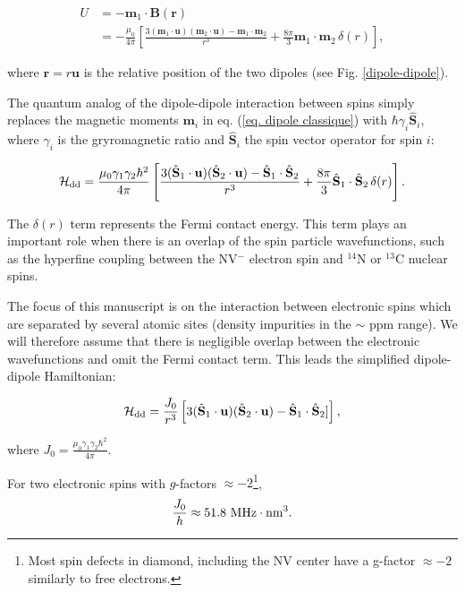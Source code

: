 \documentclass[a4paper, 11pt]{book}
\begin{document}
\begin{align}
U&=-\mathbf{m}_1 \cdot \mathbf{B}(\mathbf{r}) \nonumber \\
&=-\frac{\mu_0}{4 \pi}\left[ \frac{3 (\mathbf{m}_1\cdot\mathbf{u})(\mathbf{m}_2\cdot\mathbf{u}) - \mathbf{m}_1\cdot\mathbf{m}_2}{r^3}+\frac{8\pi}{3}\mathbf{m}_1\cdot\mathbf{m}_2\,\delta(r)\right], \label{eq. dipole classique}
\end{align}

where $\mathbf{r}=r \mathbf{u}$ is the relative position of the two dipoles (see Fig. \ref{dipole-dipole}). 

The quantum analog of the dipole-dipole interaction between spins simply replaces the magnetic moments $\mathbf{m}_i$ in eq. (\ref{eq. dipole classique}) with $\hbar \gamma_i \hat{\mathbf{S}}_i$, where $\gamma_i$ is the gryromagnetic ratio and $\hat{\mathbf{S}}_i$ the spin vector operator for spin $i$:

\begin{equation}
\mathcal{H}_{\rm dd}=\frac{\mu_0 \gamma_1 \gamma_2 \hbar^2}{4 \pi}\left[ \frac{3 (\hat{\mathbf{S}}_1\cdot\mathbf{u})(\hat{\mathbf{S}}_2\cdot\mathbf{u}) - \hat{\mathbf{S}}_1\cdot\hat{\mathbf{S}}_2}{r^3}+\frac{8\pi}{3}\hat{\mathbf{S}}_1\cdot\hat{\mathbf{S}}_2\,\delta(r)\right].
\end{equation}

The $\delta(r)$ term represents the Fermi contact energy. This term plays an important role when there is an overlap of the spin particle wavefunctions, such as the hyperfine coupling between the NV$^-$ electron spin and $^{14}$N \cite{doherty2012theory} or  $^{13}$C \cite{smeltzer201113c} nuclear spins.

The focus of this manuscript is on the interaction between electronic spins which are separated by several atomic sites (density impurities in the $\sim$ ppm range). We will therefore assume that there is negligible overlap between the electronic wavefunctions and omit the Fermi contact term. This leads the simplified dipole-dipole Hamiltonian:

\begin{equation}
\mathcal{H}_{\rm dd}= \frac{J_0}{r^3}\left[ 3 (\hat{\mathbf{S}}_1\cdot\mathbf{u})(\hat{\mathbf{S}}_2\cdot\mathbf{u}) - \hat{\mathbf{S}}_1\cdot\hat{\mathbf{S}}_2] \right],
\end{equation}

where $J_0=\frac{\mu_0 \gamma_1 \gamma_2 \hbar^2}{4 \pi}$.

For two electronic spins with $g$-factors $\approx -2$\footnote{Most spin defects in diamond, including the NV center have a g-factor $\approx -2$ similarly to free electrons.}, 
\begin{equation*}
\frac{J_0}{h} \approx 51.8\ \rm{MHz}\cdot \rm{nm}^3.
\end{equation*}
\end{document}

